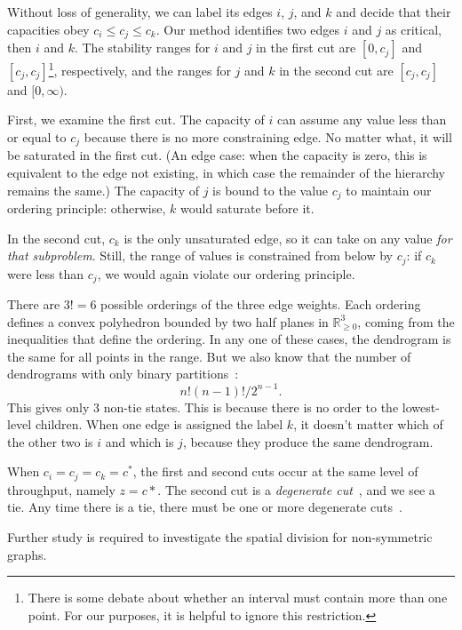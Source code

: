 Without loss of generality, we can label its edges $i$, $j$, and $k$ and decide that their capacities obey $c_i \leq c_j \leq c_k$. Our method identifies two edges $i$ and $j$ as critical, then $i$ and $k$.  The stability ranges for $i$ and $j$ in the first cut are $[0, c_j]$ and $[c_j, c_j]$\footnote{There is some debate about whether an interval must contain more than one point. For our purposes, it is helpful to ignore this restriction.}, respectively, and the ranges for $j$ and $k$ in the second cut are $[c_j, c_j]$ and $[0, \infty)$. 

First, we examine the first cut. The capacity of $i$ can assume any value less than or equal to $c_j$ because there is no more constraining edge. No matter what, it will be saturated in the first cut. (An edge case: when the capacity is zero, this is equivalent to the edge not existing, in which case the remainder of the hierarchy remains the same.) The capacity of $j$ is bound to the value $c_j$ to maintain our ordering principle: otherwise, $k$ would saturate before it. 

In the second cut, $c_k$ is the only unsaturated edge, so it can take on any value \emph{for that subproblem}. Still, the range of values is constrained from below by $c_j$: if $c_k$ were less than $c_j$, we would again violate our ordering principle. 

There are $3! = 6$ possible orderings of the three edge weights. Each ordering defines a convex polyhedron bounded by two half planes in $\mathbb{R}_{\geq 0}^3$, coming from the inequalities that define the ordering. In any one of these cases, the dendrogram is the same for all points in the range. But we also know that the number of dendrograms with only binary partitions~\cite{erdos1975refining}:
\begin{equation}
n! (n-1)! / 2^{n-1}.
\end{equation}
This gives only 3 non-tie states. This is because there is no order to the lowest-level children. When one edge is assigned the label $k$, it doesn't matter which of the other two is $i$ and which is $j$, because they produce the same dendrogram.

When $c_i = c_j = c_k = c^*$, the first and second cuts occur at the same level of throughput, namely $z=c*$. The second cut is a \emph{degenerate cut}~\cite{danna2012practical}, and we see a tie. Any time there is a tie, there must be one or more degenerate cuts~\cite{vilas2015divisive}.

Further study is required to investigate the spatial division for non-symmetric graphs.



